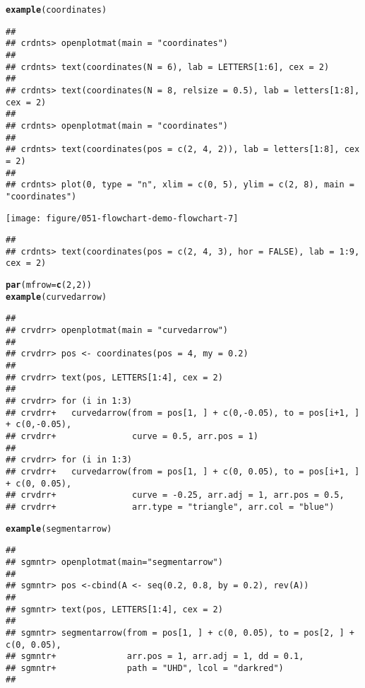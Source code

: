 \documentclass{article}\usepackage[]{graphicx}\usepackage[]{color}
\makeatletter
\def\maxwidth{ %
  \ifdim\Gin@nat@width>\linewidth
    \linewidth
  \else
    \Gin@nat@width
  \fi
}
\newcommand{\hlnum}[1]{\textcolor[rgb]{0.686,0.059,0.569}{#1}}%
\newcommand{\hlstd}[1]{\textcolor[rgb]{0.345,0.345,0.345}{#1}}%
\newcommand{\hlkwc}[1]{\textcolor[rgb]{0.333,0.667,0.333}{#1}}%
\newcommand{\hlkwd}[1]{\textcolor[rgb]{0.737,0.353,0.396}{\textbf{#1}}}%
\newenvironment{kframe}{%
 \def\at@end@of@kframe{}%
 \ifinner\ifhmode%
  \def\at@end@of@kframe{\end{minipage}}%
  \begin{minipage}{\columnwidth}%
 \fi\fi%
 \def\FrameCommand##1{\hskip\@totalleftmargin \hskip-\fboxsep
 \colorbox{shadecolor}{##1}\hskip-\fboxsep
     \hskip-\linewidth \hskip-\@totalleftmargin \hskip\columnwidth}%
 \MakeFramed {\advance\hsize-\width
   \@totalleftmargin\z@ \linewidth\hsize
   \@setminipage}}%
 {\par\unskip\endMakeFramed%
 \at@end@of@kframe}
\newenvironment{knitrout}{}{} %
\makeatother
\begin{document}
\begin{knitrout}
\begin{kframe}
\begin{verbatim}
\end{verbatim}
\begin{alltt}
\hlkwd{example}\hlstd{(coordinates)}
\end{alltt}
\begin{verbatim}
## 
## crdnts> openplotmat(main = "coordinates")
## 
## crdnts> text(coordinates(N = 6), lab = LETTERS[1:6], cex = 2)
## 
## crdnts> text(coordinates(N = 8, relsize = 0.5), lab = letters[1:8], cex = 2)
## 
## crdnts> openplotmat(main = "coordinates")
## 
## crdnts> text(coordinates(pos = c(2, 4, 2)), lab = letters[1:8], cex = 2)
## 
## crdnts> plot(0, type = "n", xlim = c(0, 5), ylim = c(2, 8), main = "coordinates")
\end{verbatim}
\end{kframe}
\texttt{[image: figure/051-flowchart-demo-flowchart-7]} 
\begin{kframe}\begin{verbatim}
## 
## crdnts> text(coordinates(pos = c(2, 4, 3), hor = FALSE), lab = 1:9, cex = 2)
\end{verbatim}
\begin{alltt}
\hlkwd{par}\hlstd{(}\hlkwc{mfrow} \hlstd{=} \hlkwd{c}\hlstd{(}\hlnum{2}\hlstd{,} \hlnum{2}\hlstd{))}
\hlkwd{example}\hlstd{(curvedarrow)}
\end{alltt}
\begin{verbatim}
## 
## crvdrr> openplotmat(main = "curvedarrow")
## 
## crvdrr> pos <- coordinates(pos = 4, my = 0.2)
## 
## crvdrr> text(pos, LETTERS[1:4], cex = 2)
## 
## crvdrr> for (i in 1:3) 
## crvdrr+   curvedarrow(from = pos[1, ] + c(0,-0.05), to = pos[i+1, ] + c(0,-0.05),
## crvdrr+               curve = 0.5, arr.pos = 1)
## 
## crvdrr> for (i in 1:3) 
## crvdrr+   curvedarrow(from = pos[1, ] + c(0, 0.05), to = pos[i+1, ] + c(0, 0.05),
## crvdrr+               curve = -0.25, arr.adj = 1, arr.pos = 0.5, 
## crvdrr+               arr.type = "triangle", arr.col = "blue")
\end{verbatim}
\begin{alltt}
\hlkwd{example}\hlstd{(segmentarrow)}
\end{alltt}
\begin{verbatim}
## 
## sgmntr> openplotmat(main="segmentarrow")
## 
## sgmntr> pos <-cbind(A <- seq(0.2, 0.8, by = 0.2), rev(A))
## 
## sgmntr> text(pos, LETTERS[1:4], cex = 2)
## 
## sgmntr> segmentarrow(from = pos[1, ] + c(0, 0.05), to = pos[2, ] + c(0, 0.05),
## sgmntr+              arr.pos = 1, arr.adj = 1, dd = 0.1, 
## sgmntr+              path = "UHD", lcol = "darkred")
## 

\end{verbatim}
\end{kframe}
\end{knitrout}
\end{document}

